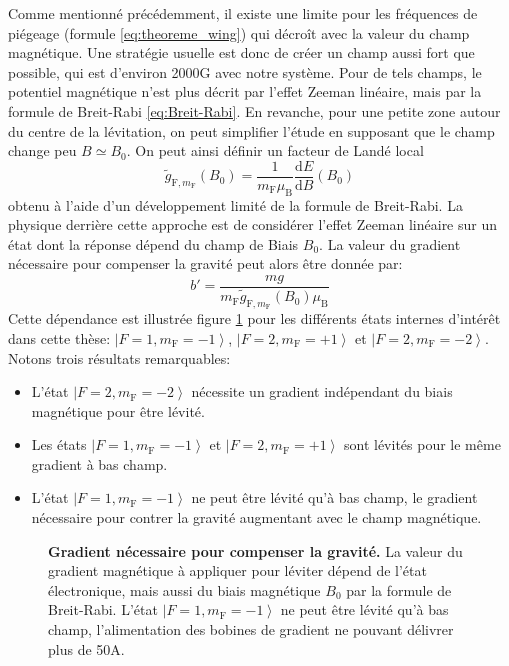 Comme mentionné précédemment, il existe une limite pour les fréquences de piégeage (formule \ref{eq:theoreme_wing}) qui décroît avec la valeur du champ magnétique. Une stratégie usuelle est donc de créer un champ aussi fort que possible, qui est d'environ 2000G avec notre système. Pour de tels champs, le potentiel magnétique n'est plus décrit par l'effet Zeeman linéaire, mais par la formule de Breit-Rabi \ref{eq:Breit-Rabi}. En revanche, pour une petite zone autour du centre de la lévitation, on peut simplifier l'étude en supposant que le champ change peu $B\simeq B_0$. On peut ainsi définir un facteur de Landé local
\begin{equation}
\widetilde{g}_{\mathrm{F},m_{\mathrm{F}}}(B_0)=\frac{1}{m_{\mathrm{F}} \mu_{\mathrm{B}}} \frac{\mathrm{d}E}{\mathrm{d}B}(B_0)
\end{equation}
obtenu à l'aide d'un développement limité de la formule de Breit-Rabi. La physique derrière cette approche est de considérer l'effet Zeeman linéaire sur un état dont la réponse dépend du champ de Biais $B_0$. La valeur du gradient nécessaire pour compenser la gravité peut alors être donnée par:
\begin{equation}
b'=\frac{mg}{m_{\mathrm{F}} \widetilde{g}_{\mathrm{F},m_{\mathrm{F}}}(B_0) \mu_{\mathrm{B}}}
\end{equation}
Cette dépendance est illustrée figure \ref{fig:levitation_etats} pour les différents états internes d'intérêt dans cette thèse: $\left| F=1,m_{\mathrm{F}}=-1 \right\rangle$, $\left| F=2, m_{\mathrm{F}}=+1 \right\rangle$ et $\left| F=2, m_{\mathrm{F}}=-2 \right\rangle$. Notons trois résultats remarquables: 
\begin{itemize}
\item[\textendash] L'état $\left| F=2, m_{\mathrm{F}}=-2 \right\rangle$ nécessite un gradient indépendant du biais magnétique pour être lévité.
\item[\textendash] Les états $\left| F=1, m_{\mathrm{F}}=-1 \right\rangle$ et $\left| F=2,m_{\mathrm{F}}=+1 \right\rangle$ sont lévités pour le même gradient à bas champ.
\item[\textendash] L'état $\left| F=1,m_{\mathrm{F}}=-1 \right\rangle$ ne peut être lévité qu'à bas champ, le gradient nécessaire pour contrer la gravité augmentant avec le champ magnétique.
\end{itemize}

\begin{figure}
\centering

\caption{\textbf{Gradient nécessaire pour compenser la gravité.} La valeur du gradient magnétique à appliquer pour léviter dépend de l'état électronique, mais aussi du biais magnétique $B_0$ par la formule de Breit-Rabi. L'état $\left| F=1, m_{\mathrm{F}}=-1 \right\rangle$ ne peut être lévité qu'à bas champ, l'alimentation des bobines de gradient ne pouvant délivrer plus de 50A.}
\label{fig:levitation_etats}
\end{figure}




